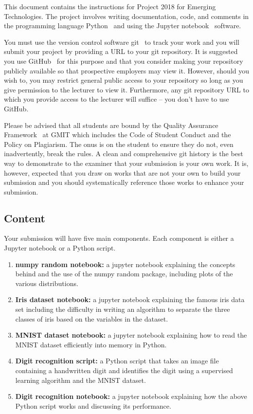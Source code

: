 \documentclass[12pt, a4paper]{article}
\title{\projectname}
\author{\modulename}
\date{Due: \duedate}
\newcommand{\modulename}{Emerging Technologies}
\newcommand{\projectyear}{2018}
\newcommand{\projectname}{Project \projectyear}
\begin{document}
\maketitle

\noindent
This document contains the instructions for \projectname{} for \modulename{}.
The project involves writing documentation, code, and comments in the programming language Python~\cite{python} and using the Jupyter notebook~\cite{jupyter} software.

You must use the version control software git~\cite{git} to track your work and you will submit your project by providing a URL to your git repository.
It is suggested you use GitHub~\cite{github} for this purpose and that you consider making your repository publicly available so that prospective employers may view it.
However, should you wish to, you may restrict general public access to your repository so long as you give permission to the lecturer to view it.
Furthermore, any git repository URL to which you provide access to the lecturer will suffice -- you don't have to use GitHub.

Please be advised that all students are bound by the Quality Assurance Framework~\cite{gmitqaf} at GMIT which includes the Code of Student Conduct and the Policy on Plagiarism.
The onus is on the student to ensure they do not, even inadvertently, break the rules.
A clean and comprehensive git history is the best way to demonstrate to the examiner that your submission is your own work.
It is, however, expected that you draw on works that are not your own to build your submission and you should systematically reference those works to enhance your submission.

\subsection*{Content}
Your submission will have five main components.
Each component is either a Jupyter notebook or a Python script.

\begin{enumerate}
  \item \textbf{numpy random notebook:} a jupyter notebook explaining the concepts behind and the use of the numpy random package, including plots of the various distributions.
  \item \textbf{Iris dataset notebook:} a jupyter notebook explaining the famous iris data set including the difficulty in writing an algorithm to separate the three classes of iris based on the variables in the dataset. 
  \item \textbf{MNIST dataset notebook:} a jupyter notebook explaining how to read the MNIST dataset efficiently into memory in Python.
  \item \textbf{Digit recognition script:} a Python script that takes an image file containing a handwritten digit and identifies the digit using a supervised learning algorithm and the MNIST dataset.
  \item \textbf{Digit recognition notebook:} a jupyter notebook explaining how the above Python script works and discussing its performance.
\end{enumerate}
\end{document}

